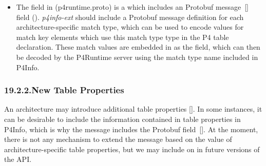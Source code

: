 \documentclass[11pt]{article}
\begin{document}
{\begin{itemize}
\item{}
The  field in  (p4runtime.proto) is a
 which includes an  Protobuf message~[] field
(). \emph{p4info-ext} should include a Protobuf message definition for each
architecture-specific match type, which can be used to encode values for match
key elements which use this match type type in the P4 table
declaration. These match values are embedded in  as the
 field, which can then be decoded by the P4Runtime server using the
match type name included in P4Info.%
\end{itemize}%

\subsubsection{19.2.2.\hspace*{0.5em}New Table Properties}\label{sec-new-table-properties}%

\noindent{}An architecture may introduce additional table properties
[]. In some instances, it can be desirable to include the
information contained in table properties in P4Info, which is why the
 message includes the   Protobuf
field~[]. At the moment, there is not any mechanism to extend the
 message based on the value of architecture-specific table
properties, but we may include on in future versions of the API.%

}
\end{document}
